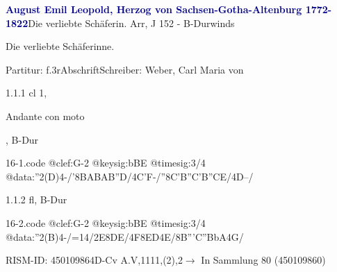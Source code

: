 \documentclass[a4paper, twocolumn, 11pt]{book}
\begin{document}
\par \vspace{16pt} \textcolor{darkblue}{\textbf{August Emil Leopold, Herzog von Sachsen-Gotha-Altenburg  1772-1822}}\hfillplus{[16]}\newline Die verliebte Schäferin. Arr, J 152 - B-Dur\newline winds
\par \begin{itshape} Die verliebte Schäferinne.\end{itshape} 
\par \textcolor{darkblue}{}  Partitur: f.3r\newline Abschrift\newline Schreiber: Weber, Carl Maria von
\par 1.1.1  cl 1, \begin{itshape}Andante con moto\end{itshape}, B-Dur  
\begin{filecontents*}{16-1.code}
@clef:G-2
@keysig:bBE
@timesig:3/4
@data:''2(D)4-/'{8BABAB''D}/4C'F-/''{8C'B''C'B''CE}/4D--/
\end{filecontents*}
\newline %
\par 1.1.2  fl, B-Dur  
\begin{filecontents*}{16-2.code}
@clef:G-2
@keysig:bBE
@timesig:3/4
@data:''2(B)4-/=14/2E{8DE}/4F{8ED}4E/{8B'''C''BbA}4G/
\end{filecontents*}
\newline %
\par RISM-ID: 450109864\newline D-Cv  A.V,1111,(2),2\newline $\rightarrow$ In Sammlung 80 (450109860)
      
\end{document}
